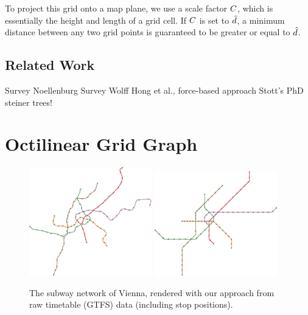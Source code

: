 \documentclass{sig-alternate-sigmod09}
\begin{document}
To project this grid onto a map plane, we use a scale factor $C$, which is essentially the height and length of a grid cell.
If $C$ is set to $\hat d$, a minimum distance between any two grid points is guaranteed to be greater or equal to $\hat d$.

\subsection{Related Work}

Survey Noellenburg %
Survey Wolff %
Hong et al., force-based approach
Stott's PhD
steiner trees! %

\section{Octilinear Grid Graph}

\begin{figure}[t]
  \centering
	\includegraphics[width=0.474\textwidth]{figures/octi_input.pdf}
	\includegraphics[width=0.474\textwidth]{figures/octi.pdf}
	\caption{The subway network of Vienna, rendered with our approach from raw timetable (GTFS) data (including stop positions).}
	\label{FIG:examplewien}
\end{figure}
\end{document}
